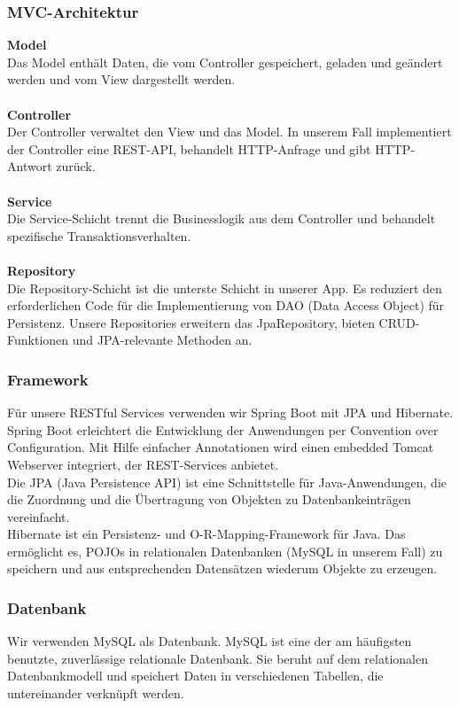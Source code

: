 
\subsubsection{MVC-Architektur}

\textbf{Model}\\
Das Model enthält Daten, die vom Controller gespeichert, geladen und geändert werden und vom View dargestellt werden. \\
\\ \textbf{Controller}\\
Der Controller verwaltet den View und das Model. In unserem Fall implementiert der Controller eine REST-API, behandelt HTTP-Anfrage und gibt HTTP-Antwort zurück.\\
\\ \textbf{Service}\\
Die Service-Schicht trennt die Businesslogik aus dem Controller und behandelt spezifische Transaktionsverhalten.\\
\\ \textbf{Repository}\\ 
Die Repository-Schicht ist die unterste Schicht in unserer App. Es reduziert den erforderlichen Code für die Implementierung von DAO (Data Access Object) für Persistenz. Unsere Repositories erweitern das JpaRepository, bieten CRUD-Funktionen und JPA-relevante Methoden an.

\subsubsection{Framework}

Für unsere RESTful Services verwenden wir Spring Boot mit JPA und Hibernate. \\
Spring Boot erleichtert die Entwicklung der Anwendungen per Convention over Configuration. Mit Hilfe einfacher Annotationen wird einen embedded Tomcat Webserver integriert, der REST-Services anbietet.\\
Die JPA (Java Persistence API) ist eine Schnittstelle für Java-Anwendungen, die die Zuordnung und die Übertragung von Objekten zu Datenbankeinträgen vereinfacht.\\
Hibernate ist ein Persistenz- und O-R-Mapping-Framework für Java. Das ermöglicht es, POJOs in relationalen Datenbanken (MySQL in unserem Fall) zu speichern und aus entsprechenden Datensätzen wiederum Objekte zu erzeugen.

\subsubsection{Datenbank}

Wir verwenden MySQL als Datenbank. MySQL ist eine der am häufigsten benutzte, zuverlässige relationale Datenbank. Sie beruht auf dem relationalen Datenbankmodell und speichert Daten in verschiedenen Tabellen, die untereinander verknüpft werden. 
